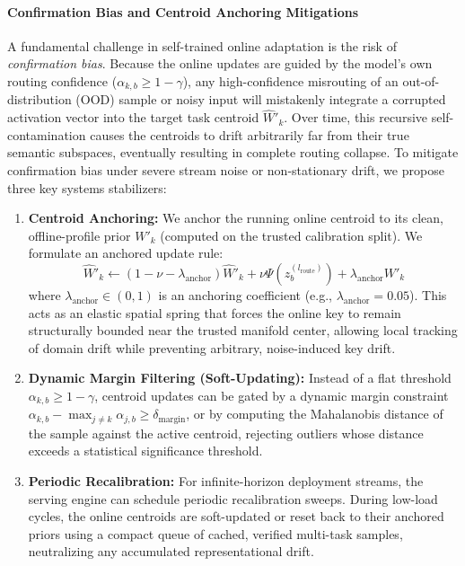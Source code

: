 \paragraph{Confirmation Bias and Centroid Anchoring Mitigations}
A fundamental challenge in self-trained online adaptation is the risk of \emph{confirmation bias}. Because the online updates are guided by the model's own routing confidence ($\alpha_{k, b} \ge 1 - \gamma$), any high-confidence misrouting of an out-of-distribution (OOD) sample or noisy input will mistakenly integrate a corrupted activation vector into the target task centroid $\hat{W}'_k$. Over time, this recursive self-contamination causes the centroids to drift arbitrarily far from their true semantic subspaces, eventually resulting in complete routing collapse. To mitigate confirmation bias under severe stream noise or non-stationary drift, we propose three key systems stabilizers:
\begin{enumerate}
    \item \textbf{Centroid Anchoring:} We anchor the running online centroid to its clean, offline-profile prior $W'_k$ (computed on the trusted calibration split). We formulate an anchored update rule:
    \begin{equation}
        \hat{W}'_k \leftarrow (1 - \nu - \lambda_{\text{anchor}}) \hat{W}'_k + \nu \Psi(z_b^{(l_{\text{route}})}) + \lambda_{\text{anchor}} W'_k
    \end{equation}
    where $\lambda_{\text{anchor}} \in (0, 1)$ is an anchoring coefficient (e.g., $\lambda_{\text{anchor}} = 0.05$). This acts as an elastic spatial spring that forces the online key to remain structurally bounded near the trusted manifold center, allowing local tracking of domain drift while preventing arbitrary, noise-induced key drift.
    \item \textbf{Dynamic Margin Filtering (Soft-Updating):} Instead of a flat threshold $\alpha_{k, b} \ge 1 - \gamma$, centroid updates can be gated by a dynamic margin constraint $\alpha_{k,b} - \max_{j \neq k} \alpha_{j,b} \ge \delta_{\text{margin}}$, or by computing the Mahalanobis distance of the sample against the active centroid, rejecting outliers whose distance exceeds a statistical significance threshold.
    \item \textbf{Periodic Recalibration:} For infinite-horizon deployment streams, the serving engine can schedule periodic recalibration sweeps. During low-load cycles, the online centroids are soft-updated or reset back to their anchored priors using a compact queue of cached, verified multi-task samples, neutralizing any accumulated representational drift.
\end{enumerate}

